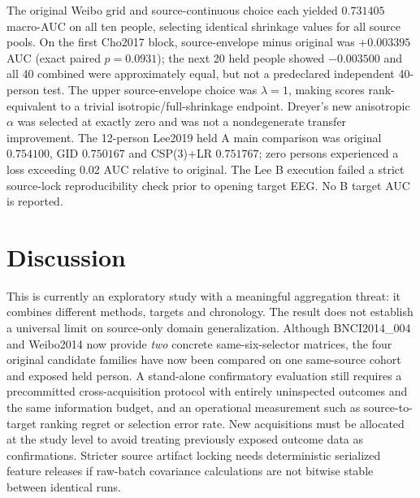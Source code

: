 \documentclass[11pt,a4paper]{article}
\begin{document}
The original Weibo grid and source-continuous
choice each yielded $0.731405$ macro-AUC on
all ten people, selecting identical shrinkage
values for all source pools. On the first
Cho2017 block, source-envelope minus original
was $+0.003395$ AUC (exact paired $p=0.0931$);
the next 20 held people showed $-0.003500$
and all 40 combined were approximately equal,
but not a predeclared independent 40-person test.
The upper source-envelope choice was
$\lambda=1$, making scores rank-equivalent
to a trivial isotropic/full-shrinkage endpoint.
Dreyer's new anisotropic $\alpha$ was selected
at exactly zero and was not a nondegenerate
transfer improvement. The 12-person
Lee2019 held A main comparison was original
$0.754100$, GID $0.750167$ and CSP(3)+LR
$0.751767$; zero persons experienced a
loss exceeding 0.02 AUC relative to original.
The Lee B execution failed a strict source-lock
reproducibility check prior to opening target
EEG. No B target AUC is reported.



















\section{Discussion}
This is currently an exploratory study with
a meaningful aggregation threat: it combines
different methods, targets and chronology.
The result does not establish a universal
limit on source-only domain generalization.
Although BNCI2014\_004 and Weibo2014 now provide
\emph{two} concrete same-six-selector matrices,
the four original candidate families have now been compared
on one same-source cohort and exposed held person. A
stand-alone confirmatory evaluation still requires
a precommitted cross-acquisition protocol with
entirely uninspected outcomes and the same information budget,
and an operational measurement such as
source-to-target ranking regret or selection
error rate. New acquisitions must be allocated
at the study level to avoid treating previously
exposed outcome data as confirmations.
Stricter source artifact locking needs
deterministic serialized feature releases
if raw-batch covariance calculations are
not bitwise stable between identical runs.
\end{document}
